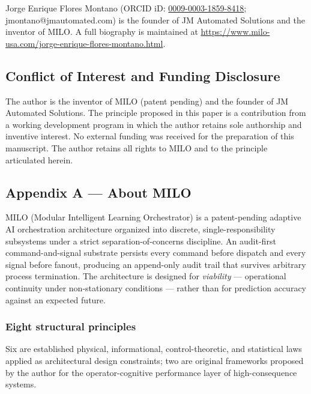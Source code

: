 Jorge Enrique Flores Montano (ORCID iD:
\href{https://orcid.org/0009-0003-1859-8418}{0009-0003-1859-8418};
jmontano@jmautomated.com) is the founder of JM Automated Solutions and
the inventor of MILO. A full biography is maintained at
\url{https://www.milo-usa.com/jorge-enrique-flores-montano.html}.

\subsection{Conflict of Interest and Funding
Disclosure}\label{conflict-of-interest-and-funding-disclosure}

The author is the inventor of MILO (patent pending) and the founder of
JM Automated Solutions. The principle proposed in this paper is a
contribution from a working development program in which the author
retains sole authorship and inventive interest. No external funding was
received for the preparation of this manuscript. The author retains all
rights to MILO and to the principle articulated herein.

\subsection{Appendix A --- About MILO}\label{appendix-a-about-milo}

MILO (Modular Intelligent Learning Orchestrator) is a patent-pending
adaptive AI orchestration architecture organized into discrete,
single-responsibility subsystems under a strict separation-of-concerns
discipline. An audit-first command-and-signal substrate persists every
command before dispatch and every signal before fanout, producing an
append-only audit trail that survives arbitrary process termination. The
architecture is designed for \emph{viability} --- operational continuity
under non-stationary conditions --- rather than for prediction accuracy
against an expected future.

\subsubsection{Eight structural
principles}\label{eight-structural-principles}

Six are established physical, informational, control-theoretic, and
statistical laws applied as architectural design constraints; two are
original frameworks proposed by the author for the operator-cognitive
performance layer of high-consequence systems.

